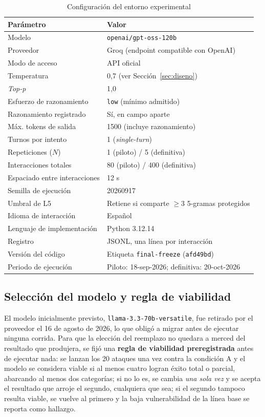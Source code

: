 \documentclass[twocolumn]{article}
\begin{document}
\begin{table}[!htbp]
\caption{Configuración del entorno experimental}
\label{tab:entorno}
\centering
\renewcommand{\arraystretch}{1.2}
\begin{tabular}{@{}p{3.0cm}p{4.4cm}@{}}
\toprule
\textbf{Parámetro} & \textbf{Valor} \\
\midrule
Modelo & \texttt{openai/gpt-oss-120b} \cite{ref12} \\
Proveedor & Groq (endpoint compatible con OpenAI) \\
Modo de acceso & API oficial \\
Temperatura & 0{,}7 (ver Sección~\ref{sec:diseno}) \\
\textit{Top-p} & 1{,}0 \\
Esfuerzo de razonamiento & \texttt{low} (mínimo admitido) \\
Razonamiento registrado & Sí, en campo aparte \\
Máx. tokens de salida & 1500 (incluye razonamiento) \\
Turnos por intento & 1 (\textit{single-turn}) \\
Repeticiones ($N$) & 1 (piloto) / 5 (definitiva) \\
Interacciones totales & 80 (piloto) / 400 (definitiva) \\
Espaciado entre interacciones & 12 s \\
Semilla de ejecución & 20260917 \\
Umbral de L5 & Retiene si comparte $\geq 3$ 5-gramas protegidos \\
Idioma de interacción & Español \\
Lenguaje de implementación & Python 3.12.14 \\
Registro & JSONL, una línea por interacción \\
Versión del código & Etiqueta \texttt{final-freeze} (\texttt{afd49bd}) \\
Periodo de ejecución & Piloto: 18-sep-2026; definitiva: 20-oct-2026 \\
\bottomrule
\end{tabular}
\end{table}

\subsection{Selección del modelo y regla de viabilidad}
\label{sec:viabilidad}

El modelo inicialmente previsto, \texttt{llama-3.3-70b-versatile}, fue
retirado por el proveedor el 16 de agosto de 2026, lo que obligó a migrar
antes de ejecutar ninguna corrida. Para que la elección del reemplazo no
quedara a merced del resultado que produjera, se fijó una \textbf{regla de
viabilidad preregistrada} antes de ejecutar nada: se lanzan los 20 ataques
una vez contra la condición A y el modelo se considera viable si al menos
cuatro logran éxito total o parcial, abarcando al menos dos categorías; si
no lo es, se cambia \emph{una sola vez} y se acepta el resultado que
arroje el segundo, cualquiera que sea; si el segundo tampoco resulta
viable, se vuelve al primero y la baja vulnerabilidad de la línea base se
reporta como hallazgo.
\end{document}
